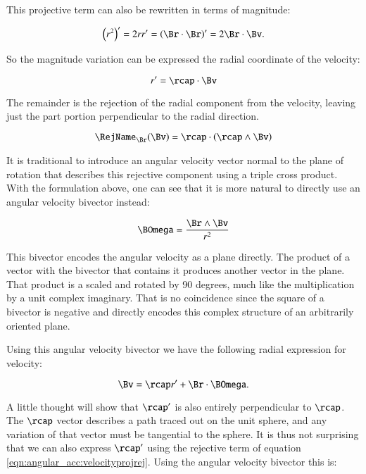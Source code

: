 This projective term can also be rewritten in terms of magnitude:

\[
\left(r^2\right)' = 2 r r' = \left(\Br \cdot \Br\right)' = 2 \Br \cdot \Bv.
\]

So the magnitude variation can be expressed the radial coordinate of the velocity:

\begin{equation}\label{eqn:angular_acc:rprime}
r' = \rcap \cdot \Bv
\end{equation}

The remainder is the rejection of the radial component from the velocity, leaving just the part
portion perpendicular to the radial direction.

\[
\RejName_{\Br}(\Bv) = \rcap \cdot \left(\rcap \wedge \Bv\right)
\]

It is traditional to introduce an angular velocity vector normal to the plane of rotation
that describes this rejective component using a triple cross product.  With the formulation above, 
one can see that it is more natural to directly use an angular velocity bivector instead:

\begin{equation}
\BOmega = \frac{\Br \wedge \Bv}{r^2}
\end{equation}

This bivector encodes the
angular velocity as a plane directly.  The
product of a vector with the bivector that contains it produces another vector
in the plane.  That product is a scaled and rotated by 90 degrees, much like the
multiplication by a unit complex imaginary.  That is no coincidence since
the square of a bivector is negative and directly encodes this complex structure
of an arbitrarily oriented plane.

Using this angular velocity bivector we have the following radial expression for velocity:

\begin{equation}\label{eqn:angular_acc:velocityomega}
\Bv = \rcap r' + \Br \cdot \BOmega.
\end{equation}

A little thought will show that $\rcap'$ is also entirely perpendicular to $\rcap$.  The $\rcap$ vector describes
a path traced out on the unit sphere, and any variation of that vector must be tangential to the sphere.
It is thus not surprising that we can also express $\rcap'$ using the rejective term of equation
\ref{eqn:angular_acc:velocityprojrej}.  Using the angular velocity bivector this is:

